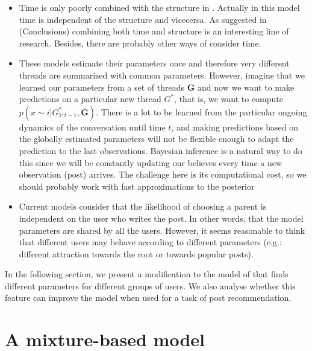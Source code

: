 \documentclass[smallextended]{svjour3}          %
\begin{document}
\begin{itemize}
	\item Time is only poorly combined with the structure in \cite{Wang2012e}. Actually in this model time is independent of the structure and vicecersa. As suggested in \cite{Gomez2012} (Conclusions) combining both time and structure is an interesting line of research. Besides, there are probably other ways of consider time.
	
	\item These models estimate their parameters once and therefore very different threads are summarized with common parameters. However, imagine that we learned our parameters from a set of threads $\mathbf{G}$ and now we want to make predictions on a particular new thread $G^*$, that is, we want to compute $p(x \sim i | G_{1:t-1}^*, \mathbf{G})$. There is a lot to be learned from the particular ongoing dynamics of the conversation until time $t$, and making predictions based on the globally estimated parameters will not be flexible enough to adapt the prediction to the last observations. Bayesian inference is a natural way to do this since we will be constantly updating our believes every time a new observation (post) arrives. The challenge here is its computational cost, so we should probably work with fast approximations to the posterior

	\item Current models consider that the likelihood of choosing a parent is independent on the user who writes the post. In other words, that the model parameters are shared by all the users. However, it seems reasonable to think that different users may behave according to different parameters (e.g.: different attraction towards the root or towards popular posts).
\end{itemize}

In the following section, we present a modification to the model of \citep{Gomez2012} that finds different parameters for different groups of users. We also analyse whether this feature can improve the model when used for a task of post recommendation. 

\section{A mixture-based model}
\end{document}
